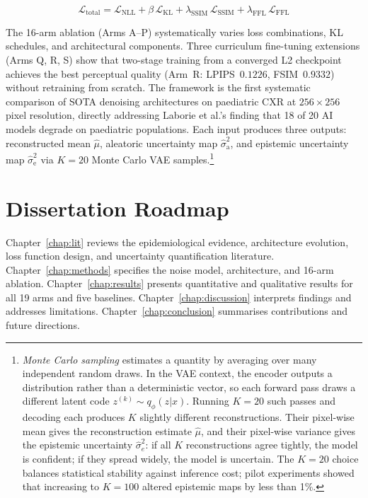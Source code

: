 \documentclass[12pt, a4paper, twoside, openright]{book}
\begin{document}
\begin{equation}
\label{eq:intro:totalloss}
\mathcal{L}_\mathrm{total} =
\mathcal{L}_\mathrm{NLL}
+ \beta\,\mathcal{L}_\mathrm{KL}
+ \lambda_{\mathrm{SSIM}}\,\mathcal{L}_\mathrm{SSIM}
+ \lambda_{\mathrm{FFL}}\,\mathcal{L}_\mathrm{FFL}
\end{equation}

The 16-arm ablation (Arms A--P) systematically varies loss combinations, KL schedules, and architectural components. Three curriculum fine-tuning extensions (Arms Q, R, S) show that two-stage training from a converged L2 checkpoint achieves the best perceptual quality (Arm~R: LPIPS~$0.1226$, FSIM~$0.9332$) without retraining from scratch. The framework is the first systematic comparison of SOTA denoising architectures on paediatric CXR at $256\times256$ pixel resolution, directly addressing Laborie et al.'s \cite{laborie_scoping_2026} finding that 18 of 20 AI models degrade on paediatric populations. Each input produces three outputs: reconstructed mean $\hat{\mu}$, aleatoric uncertainty map $\hat{\sigma}^2_\mathrm{a}$, and epistemic uncertainty map $\hat{\sigma}^2_\mathrm{e}$ via $K=20$ Monte Carlo VAE samples.\footnote{\emph{Monte Carlo sampling} estimates a quantity by averaging over many independent random draws. In the VAE context, the encoder outputs a distribution rather than a deterministic vector, so each forward pass draws a different latent code $z^{(k)} \sim q_\phi(z|x)$. Running $K=20$ such passes and decoding each produces $K$ slightly different reconstructions. Their pixel-wise mean gives the reconstruction estimate $\hat{\mu}$, and their pixel-wise variance gives the epistemic uncertainty $\hat{\sigma}^2_e$: if all $K$ reconstructions agree tightly, the model is confident; if they spread widely, the model is uncertain. The $K=20$ choice balances statistical stability against inference cost; pilot experiments showed that increasing to $K=100$ altered epistemic maps by less than 1\%.}

\section{Dissertation Roadmap}
\label{sec:intro:roadmap}

Chapter~\ref{chap:lit} reviews the epidemiological evidence, architecture evolution, loss function design, and uncertainty quantification literature. Chapter~\ref{chap:methods} specifies the noise model, architecture, and 16-arm ablation. Chapter~\ref{chap:results} presents quantitative and qualitative results for all 19 arms and five baselines. Chapter~\ref{chap:discussion} interprets findings and addresses limitations. Chapter~\ref{chap:conclusion} summarises contributions and future directions.
\end{document}
